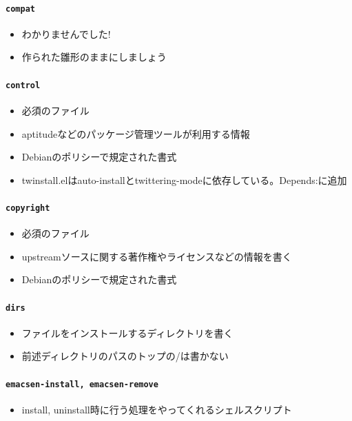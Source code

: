 \documentclass[mingoth,a4paper]{jsarticle}
\begin{document}
\paragraph{\texttt{compat}}
  \begin{itemize}
    \item わかりませんでした!
    \item 作られた雛形のままにしましょう
  \end{itemize}

\paragraph{\texttt{control}}
  \begin{itemize}
    \item 必須のファイル
    \item aptitudeなどのパッケージ管理ツールが利用する情報
    \item Debianのポリシーで規定された書式
    \item twinstall.elはauto-installとtwittering-modeに依存している。Depends:に追加
  \end{itemize}

\paragraph{\texttt{copyright}}
  \begin{itemize}
    \item 必須のファイル
    \item upstreamソースに関する著作権やライセンスなどの情報を書く
    \item Debianのポリシーで規定された書式
  \end{itemize}

\paragraph{\texttt{dirs}}
  \begin{itemize}
    \item ファイルをインストールするディレクトリを書く
    \item 前述ディレクトリのパスのトップの/は書かない
  \end{itemize}

\paragraph{\texttt{emacsen-install, emacsen-remove}}
  \begin{itemize}
    \item install, uninstall時に行う処理をやってくれるシェルスクリプト
  \end{itemize}
\end{document}
